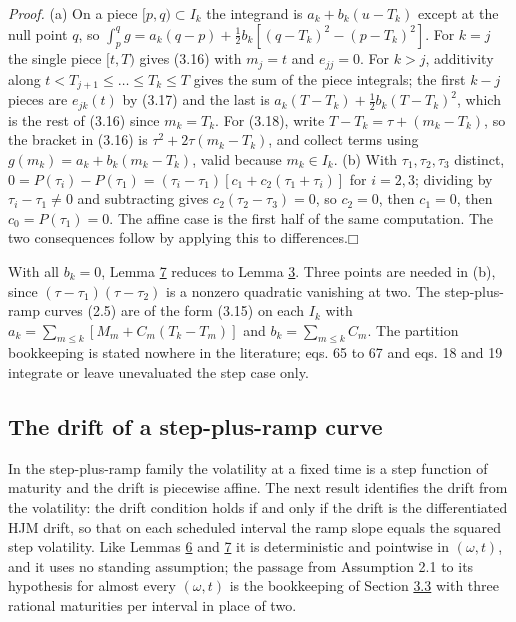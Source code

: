 \documentclass[11pt]{article}
\providecommand{\square}{\mdlgwhtsquare}
\begin{document}
\emph{Proof.} (a) On a piece \([p, q) \subset I_k\) the integrand is \(a_k + b_k(u - T_k)\) except at the null point \(q\), so \(\int_p^q g = a_k (q - p) + \tfrac12 b_k [(q - T_k)^2 - (p - T_k)^2]\). For \(k = j\) the single piece \([t, T)\) gives (3.16) with \(m_j = t\) and \(e_{jj} = 0\). For \(k > j\), additivity along \(t < T_{j+1} \le \dots \le T_k \le T\) gives the sum of the piece integrals; the first \(k - j\) pieces are \(e_{jk}(t)\) by (3.17) and the last is \(a_k (T - T_k) + \tfrac12 b_k (T - T_k)^2\), which is the rest of (3.16) since \(m_k = T_k\). For (3.18), write \(T - T_k = \tau + (m_k - T_k)\), so the bracket in (3.16) is \(\tau^2 + 2\tau(m_k - T_k)\), and collect terms using \(g(m_k) = a_k + b_k (m_k - T_k)\), valid because \(m_k \in I_k\). (b) With \(\tau_1, \tau_2, \tau_3\) distinct, \(0 = P(\tau_i) - P(\tau_1) = (\tau_i - \tau_1)[c_1 + c_2(\tau_1 + \tau_i)]\) for \(i = 2, 3\); dividing by \(\tau_i - \tau_1 \ne 0\) and subtracting gives \(c_2 (\tau_2 - \tau_3) = 0\), so \(c_2 = 0\), then \(c_1 = 0\), then \(c_0 = P(\tau_1) = 0\). The affine case is the first half of the same computation. The two consequences follow by applying this to differences.\hfill$\square$

With all \(b_k = 0\), Lemma \hyperref[res:Lemma-7]{7} reduces to Lemma \hyperref[res:Lemma-3]{3}. Three points are needed in (b), since \((\tau - \tau_1)(\tau - \tau_2)\) is a nonzero quadratic vanishing at two. The step-plus-ramp curves (2.5) are of the form (3.15) on each \(I_k\) with \(a_k = \sum_{m \le k} [M_m + C_m (T_k - T_m)]\) and \(b_k = \sum_{m \le k} C_m\). The partition bookkeeping is stated nowhere in the literature; \cite{gellert2021short} eqs. 65 to 67 and \cite{brace2024sofr} eqs. 18 and 19 integrate or leave unevaluated the step case only.

\subsection{The drift of a step-plus-ramp curve}\label{sec:3.5}

In the step-plus-ramp family the volatility at a fixed time is a step function of maturity and the drift is piecewise affine. The next result identifies the drift from the volatility: the drift condition holds if and only if the drift is the differentiated HJM drift, so that on each scheduled interval the ramp slope equals the squared step volatility. Like Lemmas \hyperref[res:Lemma-6]{6} and \hyperref[res:Lemma-7]{7} it is deterministic and pointwise in \((\omega, t)\), and it uses no standing assumption; the passage from Assumption 2.1 to its hypothesis for almost every \((\omega, t)\) is the bookkeeping of Section \hyperref[sec:3.3]{3.3} with three rational maturities per interval in place of two.
\end{document}

